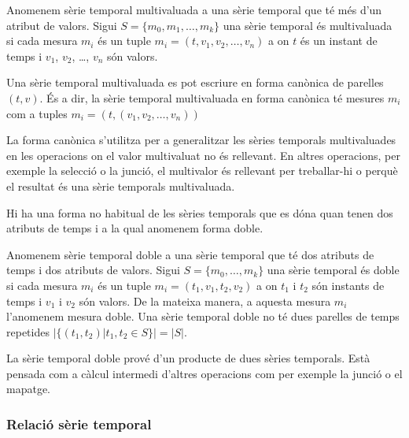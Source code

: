 \begin{definition}
  Anomenem sèrie temporal multivaluada a una sèrie temporal que té més
  d'un atribut de valors.  Sigui $S = \{ m_0, m_1 , \dotsc, m_k \}$
  una sèrie temporal és multivaluada si cada mesura $m_i$ és un tuple
  $m_i=(t,v_1,v_2,\dotsc,v_n)$ a on $t$ és un instant de temps i
  $v_1$, $v_2$, \dots, $v_n$ són valors. 

  Una sèrie temporal multivaluada es pot escriure en forma canònica de
  parelles $(t,v)$. És a dir, la sèrie temporal multivaluada en
  forma canònica té mesures $m_i$ com a tuples
  $m_i=(t,(v_1,v_2,\dotsc,v_n))$
\end{definition}

La forma canònica s'utilitza per a generalitzar les sèries temporals
multivaluades en les operacions on el valor multivaluat no és
rellevant. En altres operacions, per exemple la selecció o la junció,
el multivalor és rellevant per treballar-hi o perquè el resultat és
una sèrie temporals multivaluada. 



Hi ha una forma no habitual de les sèries temporals que es dóna quan
tenen dos atributs de temps i a la qual anomenem forma doble.

\begin{definition}
  \label{def:sgst:st-doble}
  Anomenem sèrie temporal doble a una sèrie temporal que té dos
  atributs de temps i dos atributs de valors. Sigui $S =\{m_0, \dotsc,
  m_k\}$ una sèrie temporal és doble si cada mesura $m_i$ és un tuple
  $m_i=(t_1,v_1,t_2,v_2)$ a on $t_1$ i $t_2$ són instants de temps i
  $v_1$ i $v_2$ són valors. De la mateixa manera, a aquesta mesura
  $m_i$ l'anomenem mesura doble.  Una sèrie temporal doble no té dues
  parelles de temps repetides $|\{(t_1,t_2) | t_1,t_2\in S\}| = |S|$.
\end{definition}

La sèrie temporal doble prové d'un producte de dues sèries
temporals. Està pensada com a càlcul intermedi d'altres operacions com
per exemple la junció o el mapatge. 









\subsubsection{Relació sèrie temporal}


